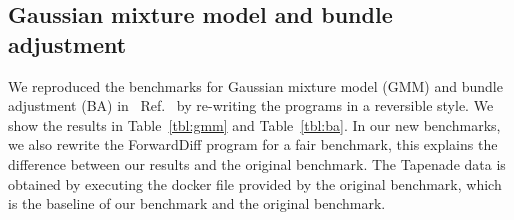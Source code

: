 \documentclass{article}
\newcommand{\<}{\langle}
\renewcommand{\>}{\rangle}
\newcommand{\Ref}[1]{Ref.~\cite{#1}}
\newcommand{\Tbl}[1]{Table~\ref{#1}}
\newcommand{\ra}[1]{\renewcommand{\arraystretch}{#1}}
\theoremstyle{definition}\newtheorem{definition}{\textit{Definition}}
\begin{document}
\subsection{Gaussian mixture model and bundle adjustment}\label{sec:ba}

We reproduced the benchmarks for Gaussian mixture model (GMM) and bundle adjustment (BA) in ~\Ref{Srajer2018} by re-writing the programs in a reversible style. We show the results in \Tbl{tbl:gmm} and \Tbl{tbl:ba}. In our new benchmarks, we also rewrite the ForwardDiff program for a fair benchmark, this explains the difference between our results and the original benchmark. The Tapenade data is obtained by executing the docker file provided by the original benchmark, which is the baseline of our benchmark and the original benchmark.

\begin{table}[h!]\centering
    \scriptsize
\begin{minipage}{\columnwidth}
\ra{1.3}
    \caption{Absolute runtimes in seconds for computing the objective (O) and gradients (G) of GMM with 10k data points.}\label{tbl:gmm}
\end{minipage}
\end{table}
\end{document}
